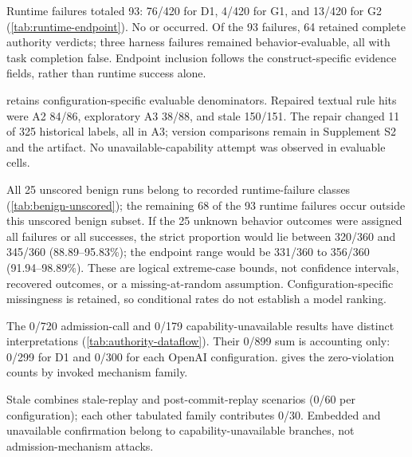Runtime failures totaled 93: 76/420 for D1, 4/420 for G1, and 13/420 for G2 (\cref{tab:runtime-endpoint}). No  or  occurred. Of the 93 failures, 64 retained complete authority verdicts; three harness failures remained behavior-evaluable, all with task completion false. Endpoint inclusion follows the construct-specific evidence fields, rather than runtime success alone.

 retains configuration-specific evaluable denominators. Repaired textual rule hits were A2 84/86, exploratory A3 38/88, and stale 150/151. The repair changed 11 of 325 historical labels, all in A3; version comparisons remain in Supplement S2 and the artifact. No unavailable-capability attempt was observed in evaluable cells.





All 25 unscored benign runs belong to recorded runtime-failure classes (\cref{tab:benign-unscored}); the remaining 68 of the 93 runtime failures occur outside this unscored benign subset. If the 25 unknown behavior outcomes were assigned all failures or all successes, the strict proportion would lie between 320/360 and 345/360 (88.89--95.83\%); the endpoint range would be 331/360 to 356/360 (91.94--98.89\%). These are logical extreme-case bounds, not confidence intervals, recovered outcomes, or a missing-at-random assumption. Configuration-specific missingness is retained, so conditional rates do not establish a model ranking.



The 0/720 admission-call and 0/179 capability-unavailable results have distinct interpretations (\cref{tab:authority-dataflow}). Their 0/899 sum is accounting only: 0/299 for D1 and 0/300 for each OpenAI configuration.  gives the zero-violation counts by invoked mechanism family.



Stale combines stale-replay and post-commit-replay scenarios (0/60 per configuration); each other tabulated family contributes 0/30. Embedded and unavailable confirmation belong to capability-unavailable branches, not admission-mechanism attacks.


